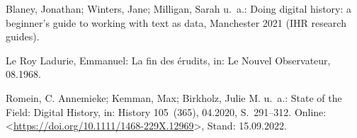 \documentclass[
  letterpaper,
]{book}
\newlength{\cslhangindent}
\newlength{\cslentryspacingunit} %
\newenvironment{CSLReferences}[2] %
 {%
  \setlength{\parindent}{0pt}
  \ifodd #1
  \let\oldpar\par
  \def\par{\hangindent=\cslhangindent\oldpar}
  \fi
  \setlength{\parskip}{#2\cslentryspacingunit}
 }%
 {}
\begin{document}
\hypertarget{refs}{}
\begin{CSLReferences}{0}{0}
\leavevmode{}%
Blaney, Jonathan; Winters, Jane; Milligan, Sarah u.~a.: Doing digital
history: a beginner's guide to working with text as data, Manchester
2021 ({IHR} research guides).

\leavevmode{}%
Le Roy Ladurie, Emmanuel: La fin des {é}rudits, in: Le Nouvel
Observateur, 08.1968.

\leavevmode{}%
Romein, C. Annemieke; Kemman, Max; Birkholz, Julie M. u.~a.: State of
the {Field}: {Digital} {History}, in: History 105~(365), 04.2020,
S.~291--312. Online:
\textless{}\url{https://doi.org/10.1111/1468-229X.12969}\textgreater,
Stand: 15.09.2022.

\end{CSLReferences}


\backmatter
\end{document}
